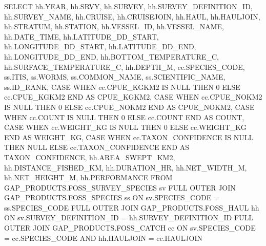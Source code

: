 \documentclass[
  letterpaper,
  oneside,
  open=any]{scrbook}
\newenvironment{Shaded}{\begin{snugshade}}{\end{snugshade}}
\newcommand{\ControlFlowTok}[1]{\textcolor[rgb]{0.00,0.23,0.31}{#1}}
\newcommand{\DataTypeTok}[1]{\textcolor[rgb]{0.68,0.00,0.00}{#1}}
\newcommand{\DecValTok}[1]{\textcolor[rgb]{0.68,0.00,0.00}{#1}}
\newcommand{\FunctionTok}[1]{\textcolor[rgb]{0.28,0.35,0.67}{#1}}
\newcommand{\KeywordTok}[1]{\textcolor[rgb]{0.00,0.23,0.31}{#1}}
\newcommand{\NormalTok}[1]{\textcolor[rgb]{0.00,0.23,0.31}{#1}}
\newcommand{\OperatorTok}[1]{\textcolor[rgb]{0.37,0.37,0.37}{#1}}
\begin{document}
\begin{Shaded}
\begin{Highlighting}[]
\KeywordTok{SELECT} 
\NormalTok{hh.}\DataTypeTok{YEAR}\NormalTok{,}
\NormalTok{hh.SRVY,                 }
\NormalTok{hh.SURVEY,}
\NormalTok{hh.SURVEY\_DEFINITION\_ID,}
\NormalTok{hh.SURVEY\_NAME,}
\NormalTok{hh.CRUISE,}
\NormalTok{hh.CRUISEJOIN,           }
\NormalTok{hh.HAUL,}
\NormalTok{hh.HAULJOIN,}
\NormalTok{hh.STRATUM,}
\NormalTok{hh.STATION,}
\NormalTok{hh.VESSEL\_ID,}
\NormalTok{hh.VESSEL\_NAME,          }
\NormalTok{hh.DATE\_TIME,}
\NormalTok{hh.LATITUDE\_DD\_START, }
\NormalTok{hh.LONGITUDE\_DD\_START, }
\NormalTok{hh.LATITUDE\_DD\_END,}
\NormalTok{hh.LONGITUDE\_DD\_END, }
\NormalTok{hh.BOTTOM\_TEMPERATURE\_C,}
\NormalTok{hh.SURFACE\_TEMPERATURE\_C,}
\NormalTok{hh.DEPTH\_M,}
\NormalTok{cc.SPECIES\_CODE,}
\NormalTok{ss.ITIS,}
\NormalTok{ss.WORMS,}
\NormalTok{ss.COMMON\_NAME,     }
\NormalTok{ss.SCIENTIFIC\_NAME,}
\NormalTok{ss.ID\_RANK,}
\ControlFlowTok{CASE} \ControlFlowTok{WHEN}\NormalTok{ cc.CPUE\_KGKM2 }\KeywordTok{IS} \KeywordTok{NULL} \ControlFlowTok{THEN} \DecValTok{0} \ControlFlowTok{ELSE}\NormalTok{ cc.CPUE\_KGKM2 }\ControlFlowTok{END} \KeywordTok{AS}\NormalTok{ CPUE\_KGKM2,}
\ControlFlowTok{CASE} \ControlFlowTok{WHEN}\NormalTok{ cc.CPUE\_NOKM2 }\KeywordTok{IS} \KeywordTok{NULL} \ControlFlowTok{THEN} \DecValTok{0} \ControlFlowTok{ELSE}\NormalTok{ cc.CPUE\_NOKM2 }\ControlFlowTok{END} \KeywordTok{AS}\NormalTok{ CPUE\_NOKM2,}
\ControlFlowTok{CASE} \ControlFlowTok{WHEN}\NormalTok{ cc.}\FunctionTok{COUNT} \KeywordTok{IS} \KeywordTok{NULL} \ControlFlowTok{THEN} \DecValTok{0} \ControlFlowTok{ELSE}\NormalTok{ cc.}\FunctionTok{COUNT} \ControlFlowTok{END} \KeywordTok{AS} \FunctionTok{COUNT}\NormalTok{,}
\ControlFlowTok{CASE} \ControlFlowTok{WHEN}\NormalTok{ cc.WEIGHT\_KG }\KeywordTok{IS} \KeywordTok{NULL} \ControlFlowTok{THEN} \DecValTok{0} \ControlFlowTok{ELSE}\NormalTok{ cc.WEIGHT\_KG }\ControlFlowTok{END} \KeywordTok{AS}\NormalTok{ WEIGHT\_KG,}
\ControlFlowTok{CASE} \ControlFlowTok{WHEN}\NormalTok{ cc.TAXON\_CONFIDENCE }\KeywordTok{IS} \KeywordTok{NULL} \ControlFlowTok{THEN} \KeywordTok{NULL} \ControlFlowTok{ELSE}\NormalTok{ cc.TAXON\_CONFIDENCE }\ControlFlowTok{END} \KeywordTok{AS}\NormalTok{ TAXON\_CONFIDENCE,}
\NormalTok{hh.AREA\_SWEPT\_KM2,       }
\NormalTok{hh.DISTANCE\_FISHED\_KM,}
\NormalTok{hh.DURATION\_HR,          }
\NormalTok{hh.NET\_WIDTH\_M,}
\NormalTok{hh.NET\_HEIGHT\_M,}
\NormalTok{hh.PERFORMANCE }
\KeywordTok{FROM}\NormalTok{ GAP\_PRODUCTS.FOSS\_SURVEY\_SPECIES sv}
\KeywordTok{FULL} \KeywordTok{OUTER} \KeywordTok{JOIN}\NormalTok{ GAP\_PRODUCTS.FOSS\_SPECIES ss}
\KeywordTok{ON}\NormalTok{ sv.SPECIES\_CODE }\OperatorTok{=}\NormalTok{ ss.SPECIES\_CODE}
\KeywordTok{FULL} \KeywordTok{OUTER} \KeywordTok{JOIN}\NormalTok{ GAP\_PRODUCTS.FOSS\_HAUL hh}
\KeywordTok{ON}\NormalTok{ sv.SURVEY\_DEFINITION\_ID }\OperatorTok{=}\NormalTok{ hh.SURVEY\_DEFINITION\_ID}
\KeywordTok{FULL} \KeywordTok{OUTER} \KeywordTok{JOIN}\NormalTok{ GAP\_PRODUCTS.FOSS\_CATCH cc}
\KeywordTok{ON}\NormalTok{ sv.SPECIES\_CODE }\OperatorTok{=}\NormalTok{ cc.SPECIES\_CODE}
\KeywordTok{AND}\NormalTok{ hh.HAULJOIN }\OperatorTok{=}\NormalTok{ cc.HAULJOIN}
\end{Highlighting}
\end{Shaded}
\end{document}
